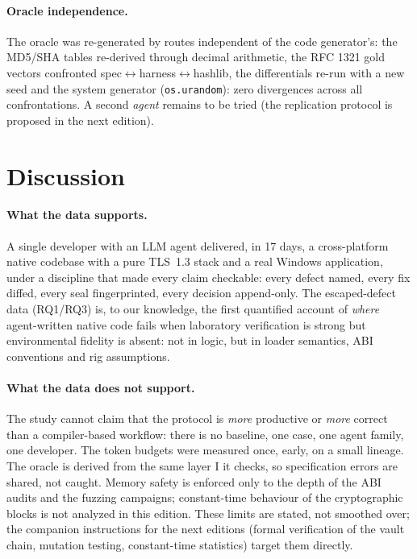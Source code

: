 \documentclass[11pt,a4paper]{article}
\newcommand{\code}[1]{\texttt{\small #1}}
\begin{document}
\paragraph{Oracle independence.} The oracle was re-generated by routes
independent of the code generator's: the MD5/SHA tables re-derived
through decimal arithmetic, the RFC 1321 gold vectors confronted
spec$\leftrightarrow$harness$\leftrightarrow$hashlib, the differentials
re-run with a new seed and the system generator (\code{os.urandom}):
zero divergences across all confrontations. A second \emph{agent} remains
to be tried (the replication protocol is proposed in the next edition).

\section{Discussion}\label{sec:discussion}

\paragraph{What the data supports.} A single developer with an LLM agent
delivered, in 17 days, a cross-platform native codebase with a pure
TLS~1.3 stack and a real Windows application, under a discipline that
made every claim checkable: every defect named, every fix diffed, every
seal fingerprinted, every decision append-only. The escaped-defect data
(RQ1/RQ3) is, to our knowledge, the first quantified account of
\emph{where} agent-written native code fails when laboratory verification
is strong but environmental fidelity is absent: not in logic, but in
loader semantics, ABI conventions and rig assumptions.

\paragraph{What the data does not support.} The study cannot claim that
the protocol is \emph{more} productive or \emph{more} correct than a
compiler-based workflow: there is no baseline, one case, one agent
family, one developer. The token budgets were measured once, early, on a
small lineage. The oracle is derived from the same layer I it checks, so
specification errors are shared, not caught. Memory safety is enforced
only to the depth of the ABI audits and the fuzzing campaigns;
constant-time behaviour of the cryptographic blocks is not analyzed in
this edition. These limits are stated, not smoothed over; the companion
instructions for the next editions (formal verification of the vault
chain, mutation testing, constant-time statistics) target them directly.
\end{document}
